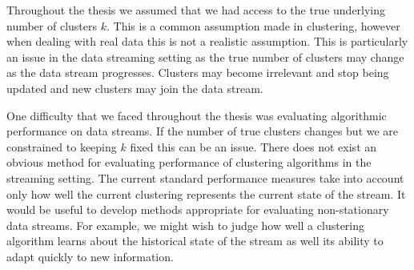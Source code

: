 

Throughout the thesis we assumed that we had access to the true underlying number of clusters $k$. This is a common assumption made in clustering, however when dealing with real data this is not a realistic assumption. This is particularly an issue in the data streaming setting as the true number of clusters may change as the data stream progresses. Clusters may become irrelevant and stop being updated and new clusters may join the data stream.


One difficulty that we faced throughout the thesis was evaluating algorithmic performance on data streams. If the number of true clusters changes but we are constrained to keeping $k$ fixed this can be an issue. There does not exist an obvious method for evaluating performance of clustering algorithms in the streaming setting. The current standard performance measures take into account only how well the current clustering represents the current state of the stream. It would be useful to develop methods appropriate for evaluating non-stationary data streams. For example, we might wish to judge how well a clustering algorithm learns about the historical state of the stream as well its ability to adapt quickly to new information.




